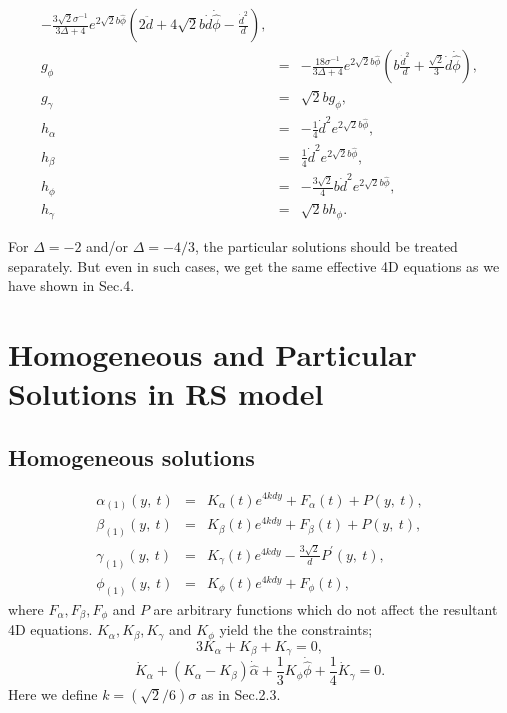\documentclass[a4paper,11pt]{article}
\begin{document}
\begin{eqnarray}
-\frac{3\sqrt{2}\sigma^{-1}}{3\Delta +4} e^{2\sqrt{2}b\hat{\phi}} 
\left(
2\ddot{d}+4\sqrt{2}b\dot{d}\dot{\hat{\phi}}
-\frac{\dot{d}^2}{d}
\right),  \\
g_{\phi} &=& 
-\frac{18\sigma^{-1}}{3\Delta +4} e^{2\sqrt{2}b\hat{\phi}}
\left(
b\frac{\dot{d}^2}{d} +\frac{\sqrt{2}}{3}\dot{d}\dot{\hat{\phi}} 
\right),  \\
g_{\gamma} &=& \sqrt{2}bg_{\phi}, \\
h_{\alpha} &=& 
-\frac{1}{4}\dot{d}^2 e^{2\sqrt{2}b\hat{\phi}}, \\
h_{\beta} &=& 
\frac{1}{4}\dot{d}^2 e^{2\sqrt{2}b\hat{\phi}}, \\
h_{\phi} &=& 
-\frac{3\sqrt{2}}{4}b\dot{d}^2 e^{2\sqrt{2}b\hat{\phi}}, \\
h_{\gamma} &=& \sqrt{2}b h_{\phi}.
\end{eqnarray}

For $\Delta = -2$ and/or $\Delta = -4/3$, the particular solutions 
should be treated separately. 
But even in such cases, we get the same effective 4D equations 
as we have shown in Sec.4.   

\section{Homogeneous and Particular Solutions in RS model \label{APP3} }

\subsection{Homogeneous solutions}

\begin{eqnarray}
\alpha_{(1)}(y,\ t) &=& K_{\alpha}(t)e^{4kdy} + F_{\alpha}(t) +P(y,\ t),  \\
\beta_{(1)}(y,\ t) &=& K_{\beta}(t)e^{4kdy} + F_{\beta}(t) 
                           +P(y,\ t),  \\
\gamma_{(1)}(y,\ t) &=& K_{\gamma}(t)e^{4kdy}
                         -\frac{3\sqrt{2}}{d}P^{\prime}(y,\ t), \\
\phi_{(1)}(y,\ t) &=& K_{\phi}(t)e^{4kdy} + F_{\phi}(t), 
\end{eqnarray} 
where $F_{\alpha}, F_{\beta}, F_{\phi}$ and $P$ are arbitrary 
functions which do not affect the resultant 4D equations. 
$K_{\alpha}, K_{\beta}, K_{\gamma}$ and $K_{\phi}$ yield the the
constraints;
\begin{equation}
3K_{\alpha}+K_{\beta}+K_{\gamma}=0, 
\end{equation}
\begin{equation}
\dot{K}_{\alpha}+(K_{\alpha}-K_{\beta})\dot{\hat{\alpha}}
+\frac{1}{3}K_{\phi}\dot{\hat{\phi}}
+\frac{1}{4}\dot{K}_{\gamma}=0.
\end{equation}
Here we define $k = (\sqrt{2}/6)\sigma $ as in Sec.2.3. 
\end{document}
